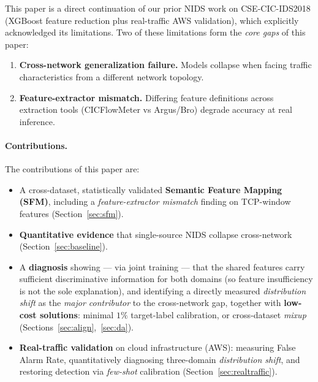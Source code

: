 \documentclass[preprint,12pt,authoryear]{elsarticle}
\begin{document}
This paper is a direct continuation of our prior NIDS work on CSE-CIC-IDS2018
(XGBoost \citep{xgboost} feature reduction plus real-traffic AWS validation), which
explicitly acknowledged its limitations. Two of these limitations form the
\emph{core gaps} of this paper:
\begin{enumerate}
  \item \textbf{Cross-network generalization failure.} Models collapse when facing
  traffic characteristics from a different network topology.
  \item \textbf{Feature-extractor mismatch.} Differing feature definitions across
  extraction tools (CICFlowMeter vs Argus/Bro) degrade accuracy at real inference.
\end{enumerate}

\paragraph{Contributions.} The contributions of this paper are:
\begin{itemize}
  \item A cross-dataset, statistically validated \textbf{Semantic Feature Mapping
  (SFM)}, including a \emph{feature-extractor mismatch} finding on TCP-window
  features (Section~\ref{sec:sfm}).
  \item \textbf{Quantitative evidence} that single-source NIDS collapse
  cross-network (Section~\ref{sec:baseline}).
  \item A \textbf{diagnosis} showing --- via joint training --- that the shared
  features carry sufficient discriminative information for both domains (so feature
  insufficiency is not the sole explanation), and identifying a directly measured
  \emph{distribution shift} as the \emph{major contributor} to the cross-network gap,
  together with \textbf{low-cost solutions}: minimal $1\%$ target-label calibration,
  or cross-dataset \emph{mixup} (Sections~\ref{sec:align},~\ref{sec:da}).
  \item \textbf{Real-traffic validation} on cloud infrastructure (AWS): measuring
  False Alarm Rate, quantitatively diagnosing three-domain \emph{distribution
  shift}, and restoring detection via \emph{few-shot} calibration
  (Section~\ref{sec:realtraffic}).
\end{itemize}
\end{document}
